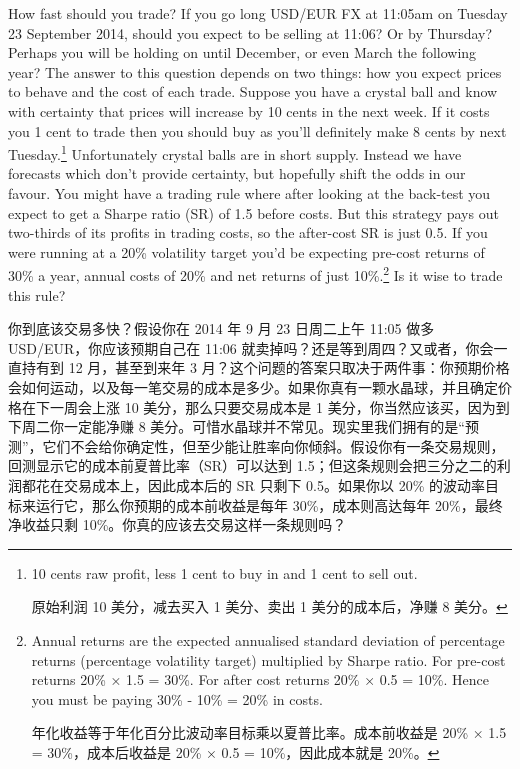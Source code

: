
\begin{englishblock} How fast should you trade? If you go long USD/EUR FX at 11:05am on Tuesday 23 September 2014, should you expect to be selling at 11:06? Or by Thursday? Perhaps you will be holding on until December, or even March the following year? The answer to this question depends on two things: how you expect prices to behave and the cost of each trade. Suppose you have a crystal ball and know with certainty that prices will increase by 10 cents in the next week. If it costs you 1 cent to trade then you should buy as you'll definitely make 8 cents by next Tuesday.\footnote{10 cents raw profit, less 1 cent to buy in and 1 cent to sell out. \par 原始利润 10 美分，减去买入 1 美分、卖出 1 美分的成本后，净赚 8 美分。} Unfortunately crystal balls are in short supply. Instead we have forecasts which don't provide certainty, but hopefully shift the odds in our favour. You might have a trading rule where after looking at the back-test you expect to get a Sharpe ratio (SR) of 1.5 before costs. But this strategy pays out two-thirds of its profits in trading costs, so the after-cost SR is just 0.5. If you were running at a 20\% volatility target you'd be expecting pre-cost returns of 30\% a year, annual costs of 20\% and net returns of just 10\%.\footnote{Annual returns are the expected annualised standard deviation of percentage returns (percentage volatility target) multiplied by Sharpe ratio. For pre-cost returns 20\% × 1.5 = 30\%. For after cost returns 20\% × 0.5 = 10\%. Hence you must be paying 30\% - 10\% = 20\% in costs. \par 年化收益等于年化百分比波动率目标乘以夏普比率。成本前收益是 20\% × 1.5 = 30\%，成本后收益是 20\% × 0.5 = 10\%，因此成本就是 20\%。} Is it wise to trade this rule? \end{englishblock}

\begin{chineseblock}你到底该交易多快？假设你在 2014 年 9 月 23 日周二上午 11:05 做多 USD/EUR，你应该预期自己在 11:06 就卖掉吗？还是等到周四？又或者，你会一直持有到 12 月，甚至到来年 3 月？这个问题的答案只取决于两件事：你预期价格会如何运动，以及每一笔交易的成本是多少。如果你真有一颗水晶球，并且确定价格在下一周会上涨 10 美分，那么只要交易成本是 1 美分，你当然应该买，因为到下周二你一定能净赚 8 美分。可惜水晶球并不常见。现实里我们拥有的是“预测”，它们不会给你确定性，但至少能让胜率向你倾斜。假设你有一条交易规则，回测显示它的成本前夏普比率（SR）可以达到 1.5；但这条规则会把三分之二的利润都花在交易成本上，因此成本后的 SR 只剩下 0.5。如果你以 20\% 的波动率目标来运行它，那么你预期的成本前收益是每年 30\%，成本则高达每年 20\%，最终净收益只剩 10\%。你真的应该去交易这样一条规则吗？\end{chineseblock}


